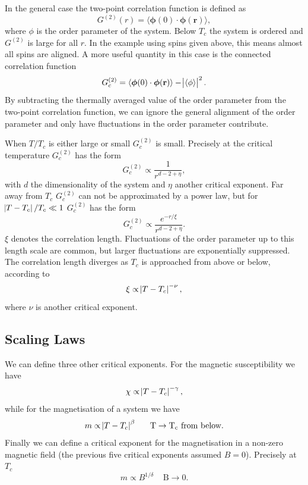 \documentclass[11pt, a4paper]{report} %
\begin{document}
In the general case the two-point correlation function is defined as
\begin{equation}
	G^{(2)}(r) = \langle \boldsymbol{\phi}(0) \cdot \boldsymbol{\phi}(\mathbf{r}) \rangle,
\end{equation}
where \(\phi\) is the order parameter of the system.
Below \(T_c\) the system is ordered and \(G^{(2)}\) is large for all \(r\).
In the example using spins given above, this means almost all spins are aligned.
A more useful quantity in this case is the connected correlation function
\begin{equation}
	G_c^{(2)} = \langle \boldsymbol{\phi}(0) \cdot \boldsymbol{\phi}(\mathbf{r}) \rangle - \abs{\langle \phi \rangle}^2.
\end{equation}
By subtracting the thermally averaged value of the order parameter from the two-point correlation function, we can ignore the general alignment of the order parameter and only have fluctuations in the order parameter contribute.

When \(T/T_c\) is either large or small \(G_c^{(2)}\) is small.
Precisely at the critical temperature \(G_c^{(2)}\) has the form
\begin{equation}
	G_c^{(2)} \propto \frac{1}{r^{d-2+\eta}},
\end{equation}
with \(d\) the dimensionality of the system and \(\eta\) another critical exponent.
Far away from \(T_c\) \(G_c^{(2)}\) can not be approximated by a power law, but for \(\abs{T-T_c} / T_c \ll 1\) \(G_c^{(2)}\) has the form
\begin{equation}
	G_c^{(2)} \propto \frac{e^{-r/\xi}}{r^{d-2+\eta}}.
\end{equation}
\(\xi\) denotes the correlation length.
Fluctuations of the order parameter up to this length scale are common, but larger fluctuations are exponentially suppressed.
The correlation length diverges as \(T_c\) is approached from above or below, according to
\begin{equation}
	\label{eq:correlation_length}
	\xi \propto \abs{T-T_c}^{-\nu},
\end{equation}
where \(\nu\) is another critical exponent.

\subsection{Scaling Laws}\label{sec:scaling_laws}
We can define three other critical exponents.
For the magnetic susceptibility we have
\begin{equation}
	\label{eq:chi_divergence}
	\chi \propto \abs{T-T_c}^{-\gamma},
\end{equation}
while for the magnetisation of a system we have
\begin{equation}
	\label{eq:magnetization_beta}
	m \propto \abs{T-T_c}^{\beta} \mathrm{\ \ \ \ \ T \to T_c\ from\ below}.
\end{equation}
Finally we can define a critical exponent for the magnetisation in a non-zero magnetic field (the previous five critical exponents assumed \(B=0\)).
Precisely at \(T_c\)
\begin{equation}
	m \propto B^{1/\delta} \mathrm{\ \ \ \ \ B \to 0}.
\end{equation}
\end{document}
